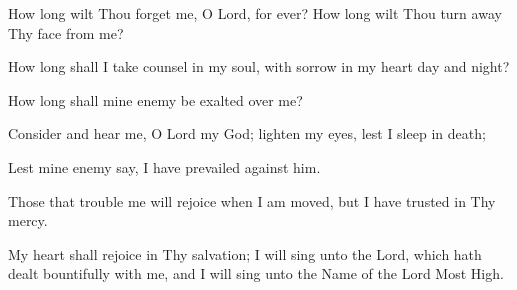 How long wilt Thou forget me, O Lord, for ever? How long wilt Thou turn away Thy face from me?

How long shall I take counsel in my soul, with sorrow in my heart day and night?

How long shall mine enemy be exalted over me?

Consider and hear me, O Lord my God; lighten my eyes, lest I sleep in death;

Lest mine enemy say, I have prevailed against him.

Those that trouble me will rejoice when I am moved, but I have trusted in Thy mercy.

My heart shall rejoice in Thy salvation; I will sing unto the Lord, which hath dealt bountifully with me, and I will sing unto the Name of the Lord Most High.
